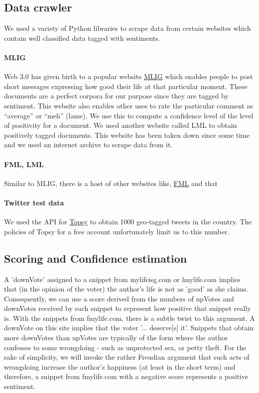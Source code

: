 \documentclass[11pt, letterpaper, conference, final, twocolumn]{ieeeconf}
\newcommand{\pcm}[2]{{\dg #1}\marginpar{\tiny\noindent{\raggedright{\dg[PC]}\br{ #2} \par}}}
\begin{document}
\subsection{Data crawler}
\label{ssec:crawler}

We used a variety of Python libraries to scrape data from certain websites which contain well classified data tagged with sentiments.
\paragraph{MLIG}
Web 3.0 has given birth to a popular website \href{http://mylifeisg.com}{MLIG} which enables people to post short messages expressing how good their life at that particular moment. These documents are a perfect corpora for our purpose since they are tagged by sentiment. This website also enables other uses to rate the particular comment as ``average'' or ``meh'' (lame). We use this to compute a confidence level of the level of positivity for a document. We used another website called LML to obtain positively tagged documents. \pcm{This website has been taken down since some time and we used an internet archive to scrape data from it.}{fix}
\paragraph{FML, LML}
Similar to MLIG, there is a host of other websites like, \href{fmylife.com}{FML} and  that 
\paragraph{Twitter test data}
We used the API for \href{topsy.com}{Topsy} to obtain 1000 geo-tagged tweets in the country. The policies of Topsy for a free account unfortunately limit us to this number.

\subsection{Scoring and Confidence estimation}
\label{ssec:scoring}

A 'downVote' assigned to a snippet from mylifeisg.com or lmylife.com implies
that (in the opinion of the voter) the author's life is not as 'good' as she
claims. Consequently, we can use a score derived from the numbers of upVotes
and downVotes received by each snippet to represent how positive that snippet
really is. With the snippets from fmylife.com, there is a subtle twist to this
argument. A downVote on this site implies that the voter '... deserve[s] it'.
Snippets that obtain more downVotes than upVotes are typically of the form
where the author confesses to some wrongdoing - such as unprotected sex, or
petty theft. For the sake of simplicity, we will invoke the rather Freudian
argument that such acts of wrongdoing increase the author's happiness (at least
in the short term) and therefore, a snippet from fmylife.com with a negative
score represents a positive sentiment.
\end{document}
